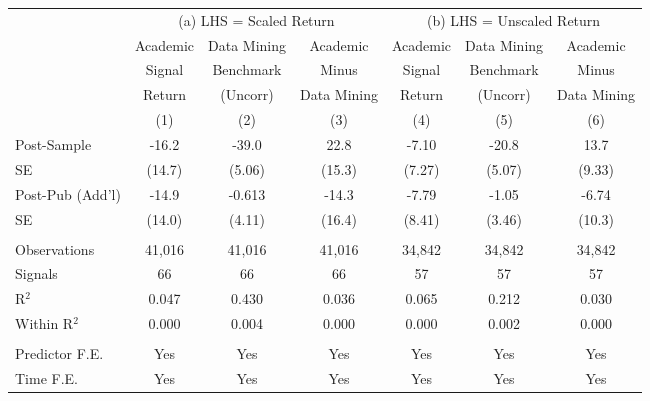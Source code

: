 \begingroup
\setlength{\tabcolsep}{0.55ex}%
\centering
\begin{tabular}{lcccccc}
   \toprule
                    & \multicolumn{3}{c}{(a) LHS = Scaled Return} & \multicolumn{3}{c}{(b) LHS = Unscaled Return} \\
   \cmidrule(lr){2-4}\cmidrule(lr){5-7}
                    & Academic
                    & Data Mining
                    & Academic
                    & Academic
                    & Data Mining
                    & Academic \\
                    & Signal
                    & Benchmark
                    & Minus
                    & Signal
                    & Benchmark
                    & Minus \\
                    & Return
                    & (Uncorr)
                    & Data Mining
                    & Return
                    & (Uncorr)
                    & Data Mining \\
                    & (1) & (2) & (3) & (4) & (5) & (6) \\
   \midrule
   Post-Sample      & -16.2 & -39.0 & 22.8 & -7.10 & -20.8 & 13.7 \\
   SE               & (14.7) & (5.06) & (15.3) & (7.27) & (5.07) & (9.33) \\
   Post-Pub (Add'l) & -14.9 & -0.613 & -14.3 & -7.79 & -1.05 & -6.74 \\
   SE               & (14.0) & (4.11) & (16.4) & (8.41) & (3.46) & (10.3) \\
   \\
   Observations     & 41,016 & 41,016 & 41,016 & 34,842 & 34,842 & 34,842 \\
   Signals          & 66 & 66 & 66 & 57 & 57 & 57 \\
   R$^2$            & 0.047 & 0.430 & 0.036 & 0.065 & 0.212 & 0.030 \\
   Within R$^2$     & 0.000 & 0.004 & 0.000 & 0.000 & 0.002 & 0.000 \\
   \\
   Predictor F.E.   & Yes & Yes & Yes & Yes & Yes & Yes \\
   Time F.E.        & Yes & Yes & Yes & Yes & Yes & Yes \\
   \bottomrule
\end{tabular}
\par\endgroup
